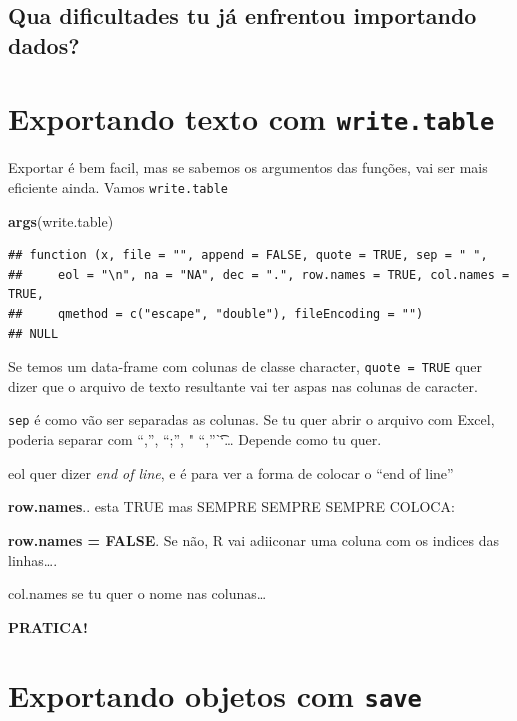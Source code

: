 \documentclass[]{book}
\newenvironment{Shaded}{\begin{snugshade}}{\end{snugshade}}
\newcommand{\KeywordTok}[1]{\textcolor[rgb]{0.13,0.29,0.53}{\textbf{#1}}}
\newcommand{\NormalTok}[1]{#1}
\begin{document}
\subsection{Qua dificultades tu já enfrentou importando
dados?}\label{qua-dificultades-tu-ja-enfrentou-importando-dados}

\section{\texorpdfstring{Exportando texto com
\texttt{write.table}}{Exportando texto com write.table}}\label{exportando-texto-com-write.table}

Exportar é bem facil, mas se sabemos os argumentos das funções, vai ser
mais eficiente ainda. Vamos \texttt{write.table}

\begin{Shaded}
\begin{Highlighting}[]
\KeywordTok{args}\NormalTok{(write.table)}
\end{Highlighting}
\end{Shaded}

\begin{verbatim}
## function (x, file = "", append = FALSE, quote = TRUE, sep = " ", 
##     eol = "\n", na = "NA", dec = ".", row.names = TRUE, col.names = TRUE, 
##     qmethod = c("escape", "double"), fileEncoding = "") 
## NULL
\end{verbatim}

Se temos um data-frame com colunas de classe character,
\texttt{quote\ =\ TRUE} quer dizer que o arquivo de texto resultante vai
ter aspas nas colunas de caracter.

\texttt{sep} é como vão ser separadas as colunas. Se tu quer abrir o
arquivo com Excel, poderia separar com ``,'', ``;'', " ``,''\t``\ldots{}
Depende como tu quer.

eol quer dizer \emph{end of line}, e é para ver a forma de colocar o
``end of line''

\textbf{row.names}.. esta TRUE mas SEMPRE SEMPRE SEMPRE COLOCA:

\textbf{row.names = FALSE}. Se não, R vai adiiconar uma coluna com os
indices das linhas\ldots{}.

col.names se tu quer o nome nas colunas\ldots{}

\textbf{PRATICA!}

\section{\texorpdfstring{Exportando objetos com
\texttt{save}}{Exportando objetos com save}}\label{exportando-objetos-com-save}
\end{document}
